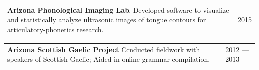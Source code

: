 \documentclass{resume} %
\begin{document}


\begin{tabular}{@{}p{}p{}@{}}
  {\bf Arizona Phonological Imaging Lab}.
   Developed software to visualize and statistically analyze ultrasonic images of tongue contours for articulatory-phonetics research.
   &
\hfill {2015}
\end{tabular}



\begin{tabular}{@{}p{}p{}@{}}
  {\bf Arizona Scottish Gaelic Project}
  Conducted fieldwork with speakers of Scottish Gaelic; Aided in online grammar compilation.
  &
\hfill  {2012 --- 2013}
\end{tabular}
\end{document}
